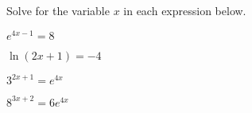 
\begin{problem}
\item Solve for the variable $x$ in each expression below.
  \begin{subproblem}
  \item $e^{4x-1}  =  8$
    \vfill
  \item $\ln(2x+1)  =  -4$
    \vfill
  \item $3^{2x+1}  =  e^{4x}$
    \vfill
  \item $8^{3x+2}  =  6e^{4x}$
    \vfill
  \end{subproblem}
\end{problem}


